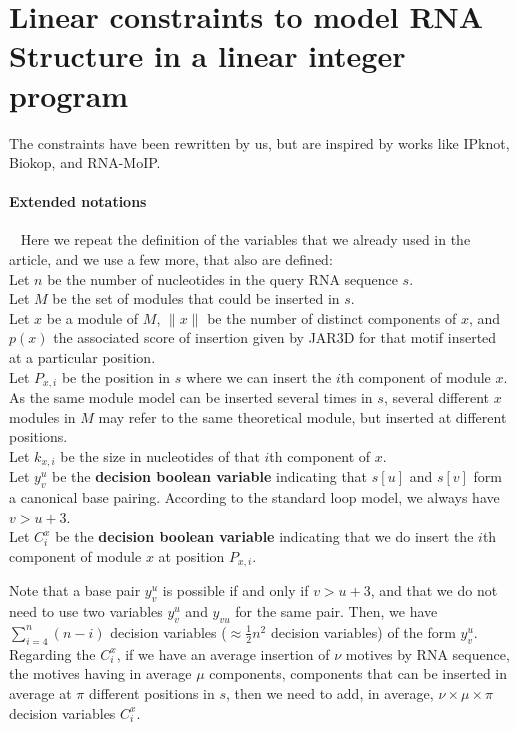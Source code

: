\documentclass{article}
\begin{document}
\appendix
\section{Linear constraints to model RNA Structure in a linear integer program}
The constraints have been rewritten by us, but are inspired by works like IPknot, Biokop, and RNA-MoIP.

\paragraph{Extended notations} ~ Here we repeat the definition of the variables that we already used in the article, and we use a few more, that also are defined:\\
Let $n$ be the number of nucleotides in the query RNA sequence $s$.\\
Let $M$ be the set of modules that could be inserted in $s$.\\
Let $x$ be a module of $M$, $\|x\|$ be the number of distinct components of $x$, and $p(x)$ the associated score of insertion given by JAR3D for that motif inserted at a particular position.\\
Let $P_{x,i}$ be the position in $s$ where we can insert the $i$th component of module $x$.\\
As the same module model can be inserted several times in $s$, several different $x$ modules in $M$ may refer to the same theoretical module, but inserted at different positions.\\
Let $k_{x,i}$ be the size in nucleotides of that $i$th component of $x$.\\
Let $y^u_v$ be the \textbf{decision boolean variable} indicating that $s[u]$ and $s[v]$ form a canonical base pairing. According to the standard loop model, we always have $v > u + 3$.\\
Let $C^x_i$ be the \textbf{decision boolean variable} indicating that we do insert the $i$th component of module $x$ at position $P_{x,i}$.


Note that a base pair $y^u_v$ is possible if and only if $v>u+3$, and that we do not need to use two variables $y^u_v$ and $y_{vu}$ for the same pair. 
Then, we have $\sum_{i=4}^n (n-i)$ decision variables ($\approx \frac{1}{2}n^2$ decision variables) of the form $y^u_v$.
Regarding the $C^x_i$, if we have an average insertion of $\nu$ motives by RNA sequence, the motives having in average $\mu$ components, components that can be inserted in average at $\pi$ different positions in $s$,
then we need to add, in average, $\nu \times \mu \times \pi$ decision variables $C^x_i$.
\end{document}
